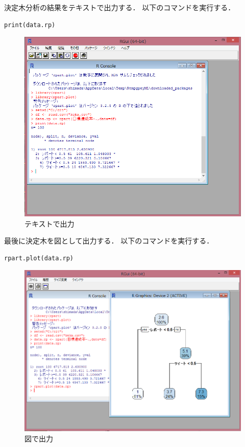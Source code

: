 \newpage
決定木分析の結果をテキストで出力する．
以下のコマンドを実行する．

\begin{verbatim}
print(data.rp)
\end{verbatim}

\begin{figure}[H]
\centering
\includegraphics[width=16cm]{R10.PNG}
\caption{テキストで出力}\label{サンプル図}
\end{figure}

最後に決定木を図として出力する．
以下のコマンドを実行する．

\newpage
\begin{verbatim}
rpart.plot(data.rp)
\end{verbatim}

\begin{figure}[H]
\centering
\includegraphics[width=16cm]{R11.PNG}
\caption{図で出力}\label{サンプル図}
\end{figure}

